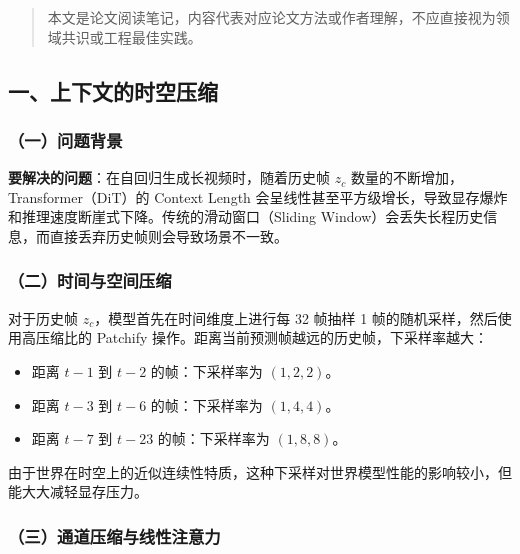 \begin{quote}
本文是论文阅读笔记，内容代表对应论文方法或作者理解，不应直接视为领域共识或工程最佳实践。
\end{quote}

\hypertarget{ux4e00ux4e0aux4e0bux6587ux7684ux65f6ux7a7aux538bux7f29}{%
\subsection{一、上下文的时空压缩}\label{ux4e00ux4e0aux4e0bux6587ux7684ux65f6ux7a7aux538bux7f29}}

\hypertarget{ux4e00ux95eeux9898ux80ccux666f-9}{%
\subsubsection{（一）问题背景}\label{ux4e00ux95eeux9898ux80ccux666f-9}}

\textbf{要解决的问题}：在自回归生成长视频时，随着历史帧 \(z_c\) 数量的不断增加，Transformer（DiT）的 Context Length 会呈线性甚至平方级增长，导致显存爆炸和推理速度断崖式下降。传统的滑动窗口（Sliding Window）会丢失长程历史信息，而直接丢弃历史帧则会导致场景不一致。

\hypertarget{ux4e8cux65f6ux95f4ux4e0eux7a7aux95f4ux538bux7f29}{%
\subsubsection{（二）时间与空间压缩}\label{ux4e8cux65f6ux95f4ux4e0eux7a7aux95f4ux538bux7f29}}

对于历史帧 \(z_c\)，模型首先在时间维度上进行每 32 帧抽样 1 帧的随机采样，然后使用高压缩比的 Patchify 操作。距离当前预测帧越远的历史帧，下采样率越大：

\begin{itemize}
\tightlist
\item
  距离 \(t-1\) 到 \(t-2\) 的帧：下采样率为 \((1,2,2)\)。
\item
  距离 \(t-3\) 到 \(t-6\) 的帧：下采样率为 \((1,4,4)\)。
\item
  距离 \(t-7\) 到 \(t-23\) 的帧：下采样率为 \((1,8,8)\)。
\end{itemize}

由于世界在时空上的近似连续性特质，这种下采样对世界模型性能的影响较小，但能大大减轻显存压力。

\hypertarget{ux4e09ux901aux9053ux538bux7f29ux4e0eux7ebfux6027ux6ce8ux610fux529b}{%
\subsubsection{（三）通道压缩与线性注意力}\label{ux4e09ux901aux9053ux538bux7f29ux4e0eux7ebfux6027ux6ce8ux610fux529b}}

